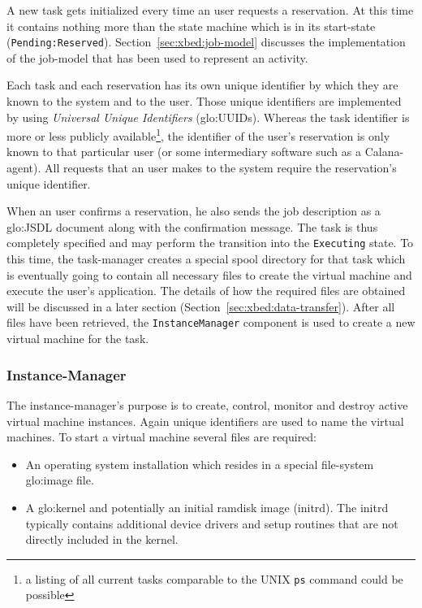 A new task gets initialized every  time an user requests a reservation. At
this time it contains nothing more  than the state machine which is in its
start-state                               (\ie \texttt{Pending:Reserved}).
Section~\ref{sec:xbed:job-model}  discusses   the  implementation  of  the
job-model that has been used to  represent an activity.

Each task and each reservation has its own unique identifier by which they
are known  to the system  and to the  user.  Those unique  identifiers are
implemented     by    using     \emph{Universal     Unique    Identifiers}
(\gls{glo:UUID}s).  Whereas  the task identifier is more  or less publicly
available\footnote{a listing  of all current tasks comparable  to the UNIX
  \texttt{ps}  command could be  possible}, the  identifier of  the user's
reservation is  only known to  that particular user (or  some intermediary
software such as  a Calana-agent). All requests that an  user makes to the
system require the reservation's unique identifier.

When an user confirms a reservation,  he also sends the job description as
a \gls{glo:JSDL}  document along with the confirmation  message.  The task
is  thus completely  specified and  may  perform the  transition into  the
\texttt{Executing} state. To this time, the task-manager creates a special
spool directory  for that  task which is  eventually going to  contain all
necessary  files to  create the  virtual  machine and  execute the  user's
application. The  details of how the  required files are  obtained will be
discussed  in   a  later  section  (Section~\ref{sec:xbed:data-transfer}).
After  all   files  have  been   retrieved,  the  \texttt{InstanceManager}
component is used to create a new virtual machine for the task.

\subsubsection{Instance-Manager}

The instance-manager's purpose is  to create, control, monitor and destroy
active virtual  machine instances.  Again  unique identifiers are  used to
name the  virtual machines. To start  a virtual machine  several files are
required:

\begin{itemize}
\item  An  operating  system  installation  which  resides  in  a  special
  file-system \gls{glo:image} file.
\item  A  \gls{glo:kernel}  and   potentially  an  initial  ramdisk  image
  (initrd). The  initrd typically  contains additional device  drivers and
  setup routines that are not directly included in the kernel.
\end{itemize}

